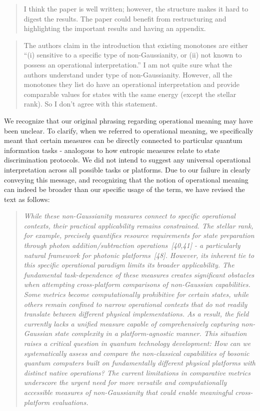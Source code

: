 \documentclass[a4paper,12pt]{article}
\newenvironment{Referee}[1]
{\noindent {\bf Comment #1:} \begin{quote} }
{\end{quote}\vspace{0 cm}}
\newenvironment{Comment}[0]
{\noindent {\bf General Comment:} \begin{quote}}
{\end{quote}\vspace{0 cm}}
\newenvironment{Response}
{\noindent \color{RawSienna}{\bf Response:} }
{\vspace{0.4 cm}}
\begin{document}
\begin{Comment}
I think the paper is well written; however, the structure makes it hard to digest the results. The paper could benefit from restructuring and highlighting the important results and having an appendix.
\end{Comment}
\fi
\begin{Referee}{1}
The authors claim in the introduction that existing monotones are either ``(i) sensitive to a specific type of non-Gaussianity, or (ii) not known to possess an operational interpretation.'' I am not quite sure what the authors understand under type of non-Gaussianity. However, all the monotones they list do have an operational interpretation and provide comparable values for states with the same energy (except the stellar rank). So I don't agree with this statement.
\end{Referee}

\begin{Response}
We recognize that our original phrasing regarding operational meaning may have been unclear. To clarify, when we referred to operational meaning, we specifically meant that certain measures can be directly connected to particular quantum information tasks - analogous to how entropic measures relate to state discrimination protocols. We did not intend to suggest any universal operational interpretation across all possible tasks or platforms. Due to our failure in clearly conveying this message, and recognizing that the notion of operational meaning can indeed be broader than our specific usage of the term, we have revised the text as follows:
\begin{quote}
    \textit{While these non-Gaussianity measures connect to specific operational contexts, their practical applicability remains constrained. The stellar rank, for example, precisely quantifies resource requirements for state preparation through photon addition/subtraction operations~[40,41] - a particularly natural framework for photonic platforms~[48]. However, its inherent tie to this specific operational paradigm limits its broader applicability. The fundamental task-dependence of these measures creates significant obstacles when attempting cross-platform comparisons of non-Gaussian capabilities. Some metrics become computationally prohibitive for certain states, while others remain confined to narrow operational contexts that do not readily translate between different physical implementations. As a result, the field currently lacks a unified measure capable of comprehensively capturing non-Gaussian state complexity in a platform-agnostic manner.
This situation raises a critical question in quantum technology development: How can we systematically assess and compare the non-classical capabilities of bosonic quantum computers built on fundamentally different physical platforms with distinct native operations? The current limitations in comparative metrics underscore the urgent need for more versatile and computationally accessible measures of non-Gaussianity that could enable meaningful cross-platform evaluations.}
\end{quote}
\end{Response}
\end{document}
